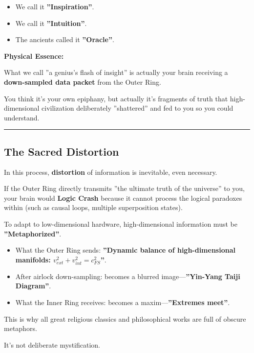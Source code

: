     \begin{itemize}
    \item We call it \textbf{''Inspiration''}.

    \item We call it \textbf{''Intuition''}.

    \item The ancients called it \textbf{''Oracle''}.
    \end{itemize}

\textbf{Physical Essence:}

What we call ''a genius's flash of insight'' is actually your brain receiving a \textbf{down-sampled data packet} from the Outer Ring.

You think it's your own epiphany, but actually it's fragments of truth that high-dimensional civilization deliberately ''shattered'' and fed to you so you could understand.

\hrule

\subsection{The Sacred Distortion}

In this process, \textbf{distortion} of information is inevitable, even necessary.

If the Outer Ring directly transmits ''the ultimate truth of the universe'' to you, your brain would \textbf{Logic Crash} because it cannot process the logical paradoxes within (such as causal loops, multiple superposition states).

To adapt to low-dimensional hardware, high-dimensional information must be \textbf{''Metaphorized''}.

\begin{itemize}
\item What the Outer Ring sends: \textbf{''Dynamic balance of high-dimensional manifolds: $v_{ext}^2 + v_{int}^2 = c_{FS}^2$''}.

\item After airlock down-sampling: becomes a blurred image---\textbf{''Yin-Yang Taiji Diagram''}.

\item What the Inner Ring receives: becomes a maxim---\textbf{''Extremes meet''}.
\end{itemize}

This is why all great religious classics and philosophical works are full of obscure metaphors.

It's not deliberate mystification.

